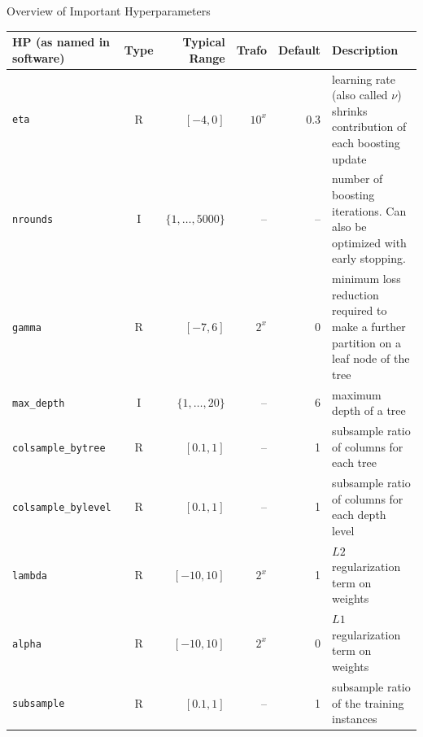 \documentclass[11pt,compress,t,notes=noshow, xcolor=table]{beamer}
\begin{document}
\begin{vbframe}{Overview of Important Hyperparameters}
  \begin{tiny}

    \begin{table}[h!]
      \begin{tabular}{p{3cm}crrrp{3cm}} \toprule
        HP (as named in software)   & Type & Typical Range       & Trafo  & Default & Description                                                                            \\
        \midrule
        \texttt{eta}                & R    & $[-4, 0]$           & $10^x$ & 0.3     & learning rate (also called $\nu$) shrinks contribution of each boosting update         \\
        \texttt{nrounds}            & I    & $\{1,\ldots,5000\}$ & --     & --      & number of boosting iterations. Can also be optimized with early stopping.              \\
        \texttt{gamma}              & R    & $[-7,6]$            & $2^x$  & 0       & minimum loss reduction required to make a further partition on a leaf node of the tree \\
        \texttt{max\_depth}         & I    & $\{1,\ldots,20\}$   & --     & 6       & maximum depth of a tree                                                                \\
        \texttt{colsample\_bytree}  & R    & $[0.1,1]$           & --     & 1       & subsample ratio of columns for each tree                                               \\
        \texttt{colsample\_bylevel} & R    & $[0.1,1]$           & --     & 1       & subsample ratio of columns for each depth level                                        \\
        \texttt{lambda}             & R    & $[-10,10]$          & $2^x$  & 1       & $L2$ regularization term on weights                                                   \\

        \texttt{alpha}              & R    & $[-10,10]$          & $2^x$  & 0       & $L1$ regularization term on weights                                                   \\
        \texttt{subsample}          & R    & $[0.1,1]$           & --     & 1       & subsample ratio of the training instances                                              \\
        \bottomrule
      \end{tabular}
    \end{table}
  \end{tiny}
\end{vbframe}
\end{document}
